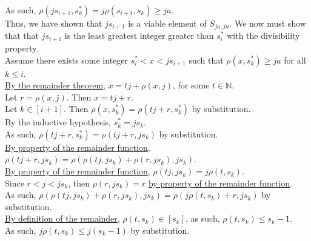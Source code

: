 \documentclass[a4paper,12pt]{article}
\begin{document}
\noindent As such, $\rho(js_{i+1}, s^*_k) = j \rho(s_{i+1}, s_k) \geq ja$.\\

\noindent Thus, we have shown that $js_{i+1}$ is a viable element of $S_{ja, jn}$. We now must show that that $js_{i+1}$ is the least greatest integer greater than $s^*_i$ with the divisibility property.\\

\noindent Assume there exists some integer $s^*_i < x < js_{i+1}$ such that $\rho(x, s^*_k) \geq ja$ for all $k \leq i$.\\

\noindent \hyperlink{theorem:remainder_theorem}{By the remainder theorem}, $x = tj + \rho(x, j)$, for some $t \in \mathbb{N}$.\\

\noindent Let $r = \rho(x, j)$. Then $x = tj + r$.\\

\noindent Let $k \in [i + 1]$. Then $\rho(x, s^*_k) = \rho(tj + r, s^*_k)$ by substitution.\\

\noindent By the inductive hypothesis, $s^*_k = js_k$.\\

\noindent As such, $\rho(tj + r, s^*_k) = \rho(tj + r, js_k)$ by substitution.\\

\noindent \hyperlink{remainder_properties}{By property of the remainder function}, $\rho(tj + r, js_k) = \rho(\rho(tj, js_k) + \rho(r, js_k), js_k)$.\\

\noindent \hyperlink{remainder_properties}{By property of the remainder function}, $\rho(tj, js_k) = j \rho(t, s_k)$.\\

\noindent Since $r < j < js_k$, then $\rho(r, js_k) = r$ \hyperlink{remainder_properties}{by property of the remainder function}.\\

\noindent As such, $\rho(\rho(tj, js_k) + \rho(r, js_k), js_k) = \rho(j \rho(t, s_k) + r, js_k)$ by substitution.\\

\noindent \hyperlink{theorem:remainder_theorem}{By definition of the remainder}, $\rho(t, s_k) \in [s_k]$, as such, $\rho(t, s_k) \leq s_k - 1$.\\

\noindent As such, $j \rho(t, s_k) \leq j(s_k - 1)$ by substitution.\\
\end{document}
